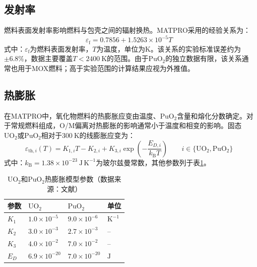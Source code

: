 \subsection{发射率}

燃料表面发射率影响燃料与包壳之间的辐射换热。MATPRO采用的经验关系为：
\begin{equation}
	\varepsilon_{\mathrm f}=0.7856+1.5263\times10^{-5}T
	\label{eq:mox_emissivity}
\end{equation}
\noindent 式中：$\varepsilon_{\mathrm f}$为燃料表面发射率，$T$为温度，单位为$\mathrm{K}$。该关系的实验标准误差约为$\pm6.8\%$，数据主要覆盖$T<2400\ \mathrm{K}$的范围。由于$\mathrm{PuO}_2$的独立数据有限，该关系通常也用于MOX燃料；高于实验范围的计算结果应视为外推值。

\subsection{热膨胀}

在MATPRO中，氧化物燃料的热膨胀应变由温度、$\mathrm{PuO}_2$含量和熔化分数确定。对于常规燃料组成，O/M偏离对热膨胀的影响通常小于温度和相变的影响。固态$\mathrm{UO}_2$或$\mathrm{PuO}_2$相对于$300\ \mathrm{K}$的线膨胀应变为：
\begin{equation}
	\varepsilon_{\mathrm{th},i}(T)
	=K_{1,i}T-K_{2,i}
	+K_{3,i}\exp\!\left(-\frac{E_{D,i}}{k_{\mathrm{B}}T}\right)
	\qquad i\in\{\mathrm{UO}_2,\mathrm{PuO}_2\}
	\label{eq:oxide_solid_thermal_expansion}
\end{equation}
\noindent 式中：$k_{\mathrm{B}}=1.38\times10^{-23}\ \mathrm{J\,K^{-1}}$为玻尔兹曼常数，其他参数列于表\ref{tab:mox_thermal_expansion_parameters}。

\begin{table}[htbp]
	\centering
	\caption{$\mathrm{UO}_2$和$\mathrm{PuO}_2$热膨胀模型参数（数据来源：文献\cite{hagrmanSCDAPRELAP5MOD1995}）}
	\label{tab:mox_thermal_expansion_parameters}
	\begin{tabularx}{\textwidth}{
			>{\centering\arraybackslash}p{}
			>{\centering\arraybackslash}X
			>{\centering\arraybackslash}X
			>{\centering\arraybackslash}p{}
		}
		\toprule
		参数 & $\mathrm{UO}_2$ & $\mathrm{PuO}_2$ & 单位 \\
		\midrule
		$K_1$ & $1.0\times10^{-5}$  & $9.0\times10^{-6}$  & $\mathrm{K^{-1}}$ \\
		$K_2$ & $3.0\times10^{-3}$  & $2.7\times10^{-3}$  & -- \\
		$K_3$ & $4.0\times10^{-2}$  & $7.0\times10^{-2}$  & -- \\
		$E_D$ & $6.9\times10^{-20}$ & $7.0\times10^{-20}$ & $\mathrm{J}$ \\
		\bottomrule
	\end{tabularx}
\end{table}

